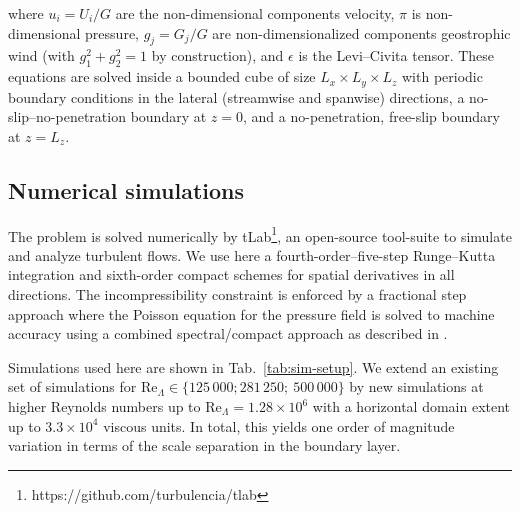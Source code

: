 \documentclass[smallcondensed,final]{svjour3}
\newcommand{\RE}{\mathrm{Re}}
\begin{document}
where $u_i=U_i/G$ are the non-dimensional components velocity, $\pi$ is non-dimen\-sio\-nal pressure, $g_j=G_j/G$ are non-dimensionalized components geostrophic wind (with $g_{1}^2+g_{2}^2=1$ by construction), and $\epsilon$ is the Levi--Civita tensor.
%
These equations are solved inside a bounded cube of size $L_x \times L_y \times L_z$ with periodic boundary conditions in the lateral (streamwise and spanwise) directions, a no-slip--no-penetration boundary at $z=0$, and
a no-penetration, free-slip boundary at $z=L_z$.
%
\subsection{Numerical simulations}
The problem is solved numerically by tLab\footnote{https://github.com/turbulencia/tlab},
an open-source tool-suite to simulate and analyze turbulent flows.
% 
We use here a fourth-order--five-step Runge--Kutta integration and sixth-order compact schemes
for spatial derivatives in all directions.
%
The incompressibility constraint is enforced by a fractional step approach where the Poisson equation
for the pressure field is solved to machine accuracy using a combined spectral/compact approach as
described in \citet{mellado:ZaM2012}.
%
\par
%
Simulations used here are shown in Tab.~\ref{tab:sim-setup}.
%
We extend an existing set of simulations for $\RE_\Lambda\in\{125\,000; 281\,250;\ 500\,000\}$ \citep[gray shading; cf.][]{ansorge:BM2014,ansorge:JFM2016} 
by new simulations at higher Reynolds numbers up to $\RE_\Lambda=1.28\times10^6$ with a horizontal domain extent up to $3.3\times 10^4$ viscous units. 
%
In total, this yields one order of magnitude variation in terms of the scale separation in the boundary layer.
%
\end{document}
